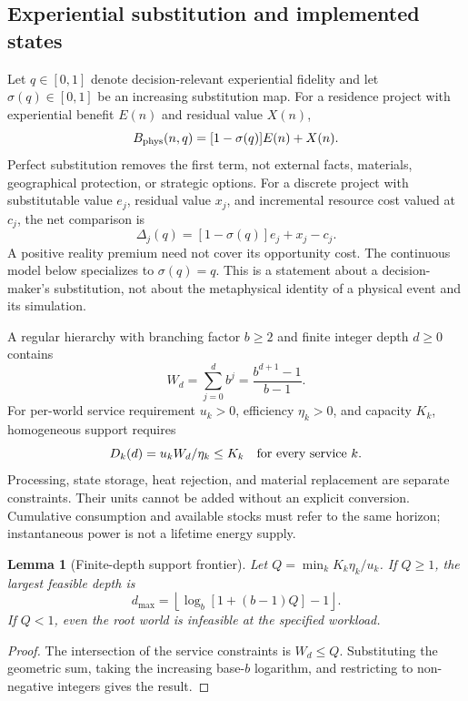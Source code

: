 \documentclass[11pt,a4paper]{article}
\newtheorem{lemma}[proposition]{Lemma}
\theoremstyle{definition}\newtheorem{definition}{Definition}
\begin{document}
\subsection{Experiential substitution and implemented states}
Let $q\in[0,1]$ denote decision-relevant experiential fidelity and let
$\sigma(q)\in[0,1]$ be an increasing substitution map. For a residence
project with experiential benefit $E(n)$ and residual value $X(n)$,
\begin{equation}
 B_{\rm phys}(n,q)=[1-\sigma(q)]E(n)+X(n).
 \label{eq:experiential}
\end{equation}
Perfect substitution removes the first term, not external facts, materials,
geographical protection, or strategic options. For a discrete project with
substitutable value $e_j$, residual value $x_j$, and incremental resource
cost valued at $c_j$, the net comparison is
\begin{equation}
 \Delta_j(q)=[1-\sigma(q)]e_j+x_j-c_j.\label{eq:premium}
\end{equation}
A positive reality premium need not cover its opportunity cost. The
continuous model below specializes to $\sigma(q)=q$. This is a statement
about a decision-maker's substitution, not about the metaphysical identity
of a physical event and its simulation.

A regular hierarchy with branching factor $b\geq2$ and finite integer
depth $d\geq0$ contains
\begin{equation}
 W_d=\sum_{j=0}^{d}b^j=\frac{b^{d+1}-1}{b-1}.\label{eq:worlds}
\end{equation}
For per-world service requirement $u_k>0$, efficiency $\eta_k>0$, and
capacity $K_k$, homogeneous support requires
\begin{equation}
 D_k(d)=u_kW_d/\eta_k\leq K_k\quad\hbox{for every service }k.
 \label{eq:resource}
\end{equation}
Processing, state storage, heat rejection, and material replacement are
separate constraints. Their units cannot be added without an explicit
conversion. Cumulative consumption and available stocks must refer to the
same horizon; instantaneous power is not a lifetime energy supply.

\begin{lemma}[Finite-depth support frontier]
\label{prop:depth}
Let $Q=\min_kK_k\eta_k/u_k$. If $Q\geq1$, the largest feasible depth is
\begin{equation}
 d_{\max}=\left\lfloor\log_b[1+(b-1)Q]-1\right\rfloor.
 \label{eq:depth-bound}
\end{equation}
If $Q<1$, even the root world is infeasible at the specified workload.
\end{lemma}
\begin{proof}
The intersection of the service constraints is $W_d\leq Q$. Substituting
the geometric sum, taking the increasing base-$b$ logarithm, and restricting
to non-negative integers gives the result.
\end{proof}
\end{document}
